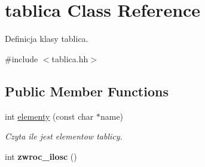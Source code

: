 \hypertarget{classtablica}{\section{tablica \-Class \-Reference}
\label{classtablica}
}


\-Definicja klasy tablica.  




{\ttfamily \#include $<$tablica.\-hh$>$}

\subsection*{\-Public \-Member \-Functions}
\begin{DoxyCompactItemize}
\item 
int \hyperlink{classtablica_a11a5b5b289a911579321b042cbad453b}{elementy} (const char $\ast$name)
\begin{DoxyCompactList}\small\item\em \-Czyta ile jest elementow tablicy. \end{DoxyCompactList}\item 
\hypertarget{classtablica_a2950e64646edd3dc0df7e190774ae537}{int {\bfseries zwroc\-\_\-ilosc} ()}\label{classtablica_a2950e64646edd3dc0df7e190774ae537}


\end{DoxyCompactItemize}
